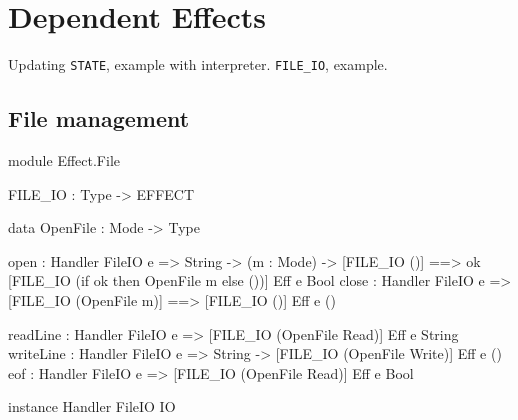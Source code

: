 \section{Dependent Effects}

Updating \texttt{STATE}, example with interpreter.
\texttt{FILE\_IO}, example.

\subsection{File management}

\begin{code}[float=h,frame=single, caption={File I/O Effect}, label=eff:fileio]
module Effect.File

FILE_IO : Type -> EFFECT

data OpenFile : Mode -> Type

open  : Handler FileIO e => String -> (m : Mode) -> 
        { [FILE_IO ()] ==> 
          {ok} [FILE_IO (if ok then OpenFile m else ())] } Eff e Bool
close : Handler FileIO e =>
        { [FILE_IO (OpenFile m)] ==> [FILE_IO ()] } Eff e ()

readLine  : Handler FileIO e => 
           { [FILE_IO (OpenFile Read)] } Eff e String 
writeLine : Handler FileIO e => String -> 
           { [FILE_IO (OpenFile Write)] } Eff e ()
eof       : Handler FileIO e => 
           { [FILE_IO (OpenFile Read)] } Eff e Bool 

instance Handler FileIO IO
\end{code}

